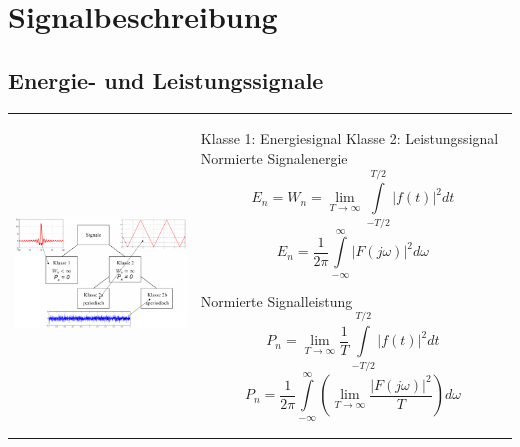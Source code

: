 \newcommand{\titleinfo}{Signale und Systeme 1 - Zusammenfassung}
\newcommand{\authorinfo}{Braun \& Co, J.Rast}
\newcommand{\versioninfo}{$Revision: 1 $ - powered by \LaTeX} 

%



\section{Signalbeschreibung }
\subsection{Energie- und Leistungssignale }
\begin{tabular}{ll}
\parbox{12cm}{
	\includegraphics[width=12cm]{./bilder/signalklassen.png}}
	& \parbox{6cm}{
	Klasse 1: Energiesignal\\
	Klasse 2: Leistungssignal\\ \\
	Normierte Signalenergie 
	$$E_n = W_n = \lim\limits_{T\rightarrow\infty}\int\limits_{-T/2}^{T/2}
	|f(t)|^2dt$$
	$$E_n = \frac{1}{2 \pi} \int\limits_{-\infty}^{\infty} |F(j \omega)|^2 d \omega$$ 
	
	Normierte Signalleistung
	$$P_n = \lim\limits_{T\rightarrow\infty}\frac{1}{T}\int\limits_{-T/2}^{T/2}
	|f(t)|^2dt$$ 
	$$P_n = \frac{1}{2 \pi} \int\limits_{-\infty}^{\infty} \left( \lim\limits_{T
	\rightarrow \infty} \frac{|F(j \omega)|^2}{T} \right) d \omega$$ }
\end{tabular}

